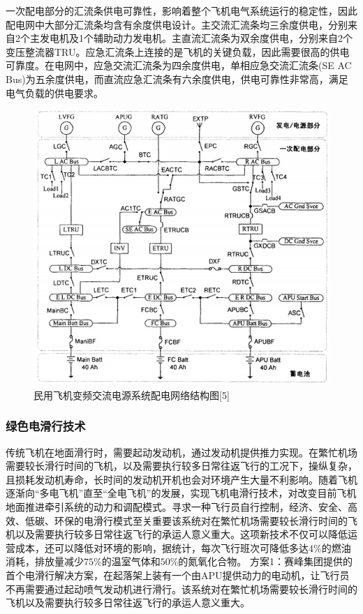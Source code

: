 \documentclass[12pt,a4paper]{report}
\begin{document}
一次配电部分的汇流条供电可靠性，影响着整个飞机电气系统运行的稳定性，因此配电网中大部分汇流条均含有余度供电设计。主交流汇流条均三余度供电，分别来自2个主发电机及1个辅助动力发电机。主直流汇流条为双余度供电，分别来自2个变压整流器TRU。应急汇流条上连接的是飞机的关键负载，因此需要很高的供电可靠度。在电网中，应急交流汇流条为四余度供电，单相应急交流汇流条(SE AC Bus)为五余度供电，而直流应急汇流条有六余度供电，供电可靠性非常高，满足电气负载的供电要求。

\begin{figure}[htp]
\centering
   \includegraphics[width=.7\textwidth]{electricnetwork.jpg}
    \caption{民用飞机变频交流电源系统配电网络结构图[5]}
    \label{fig:network}
\end{figure}

\subsubsection{绿色电滑行技术}
传统飞机在地面滑行时，需要起动发动机，通过发动机提供推力实现。在繁忙机场需要较长滑行时间的飞机，以及需要执行较多日常往返飞行的工况下，操纵复杂，且损耗发动机寿命，长时间的发动机开机也会对环境产生大量不利影响。随着飞机逐渐向“多电飞机”直至“全电飞机”的发展，实现飞机电滑行技术，对改变目前飞机地面推进牵引系统的动力和调配模式。寻求一种飞行员自行控制，经济、安全、高效、低碳、环保的电滑行模式至关重要该系统对在繁忙机场需要较长滑行时间的飞机以及需要执行较多日常往返飞行的承运人意义重大。这项新技术不仅可以降低运营成本，还可以降低对环境的影响，据统计，每次飞行班次可降低多达$4\%$的燃油消耗，排放量减少$75\%$的温室气体和$50\%$的氮氧化合物。
方案1：赛峰集团提供的首个电滑行解决方案，在起落架上装有一个由APU提供动力的电动机，让飞行员不再需要通过起动喷气发动机进行滑行。该系统对在繁忙机场需要较长滑行时间的飞机以及需要执行较多日常往返飞行的承运人意义重大。
\end{document}
